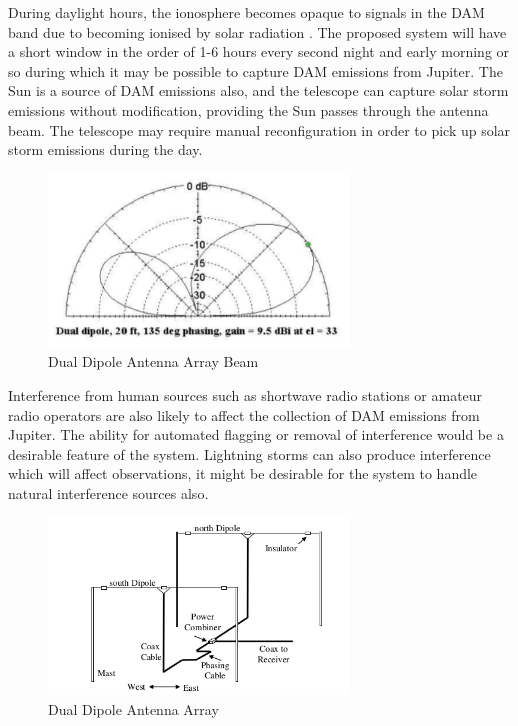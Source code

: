 \documentclass[runningheads,a4paper]{llncs}
\begin{document}
During daylight hours, the ionosphere becomes opaque to signals in the \gls{DAM} band due to becoming ionised by solar radiation \citep{nasa-ionosphere-12}. The proposed system will have a short window in the order of 1-6 hours every second night and early morning or so during which it may be possible to capture \gls{DAM} emissions from Jupiter. The Sun is a source of \gls{DAM} emissions also, and the telescope can capture solar storm emissions without modification, providing the Sun passes through the antenna beam. The telescope may require manual reconfiguration in order to pick up solar storm emissions during the day.


%
\begin{figure}[here]
\centering
\includegraphics[width=8cm]{images/09}
\caption{Dual Dipole Antenna Array Beam\citep{nasa12}}
\label{fig:dual_dipole_antenna_array_beam}
\end{figure}
%

Interference from human sources such as shortwave radio stations or amateur radio operators are also likely to affect the collection of \gls{DAM} emissions from Jupiter. The ability for automated flagging or removal of interference would be a desirable feature of the system. Lightning storms can also produce interference which will affect observations, it might be desirable for the system to handle natural interference sources also.

%
\begin{figure}[here]
\centering
\includegraphics[width=8cm]{images/08}
\caption{Dual Dipole Antenna Array \citep{nasa12}}
\label{fig:dual_dipole_antenna_array}
\end{figure}
%
\end{document}
